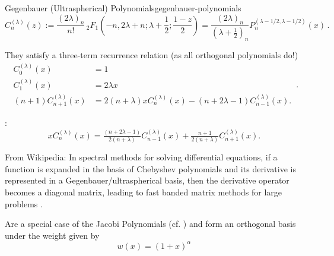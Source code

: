 \begin{definition}{Gegenbauer (Ultraspherical) Polynomials}{gegenbauer-polynomials}
  $$C_{n}^{{( \lambda )}}(z) := {\frac  {(2\lambda )_{n}}{n!}}\,_{2}F_{1}\left(-n,2\lambda +n;\lambda +{\frac  {1}{2}};{\frac  {1-z}{2}}\right) = {\frac  {(2\lambda )_{n}}{(\lambda +{\frac  {1}{2}})_{{n}}}}P_{n}^{{(\lambda -1/2,\lambda -1/2)}}(x)\,.$$
\end{definition}

They satisfy a three-term recurrence relation (as all orthogonal polynomials do!)
$${ {\begin{aligned}C_{0}^{(\lambda )}(x)&=1\\C_{1}^{(\lambda )}(x)&=2\lambda x\\(n+1)C_{n+1}^{(\lambda )}(x)&=2(n+\lambda )xC_{n}^{(\lambda )}(x)-(n+2\lambda -1)C_{n-1}^{(\lambda )}(x).\end{aligned}}}\,.$$

\cite[18.9.1]{2018-nist}:
\begin{equation}\label{eq:ultraspherical-rec}
  x C_n^{(\lambda)}(x) = \tfrac{(n+2\lambda-1)}{2(n+\lambda)}C_{n-1}^{(\lambda)}(x) + \tfrac{n+1}{2(n+\lambda)}C_{n+1}^{(\lambda)}(x).
\end{equation}

From Wikipedia: In spectral methods for solving differential equations, if a function is expanded in the basis of Chebyshev polynomials and its derivative is represented in a Gegenbauer/ultraspherical basis, then the derivative operator becomes a diagonal matrix, leading to fast banded matrix methods for large problems \parencite{2013-a-fast-and-well-conditioned-spectral-method}.

Are a special case of the Jacobi Polynomials (cf. ) and form an orthogonal basis under the weight given by
$$w(x)=(1+x)^\alpha$$
